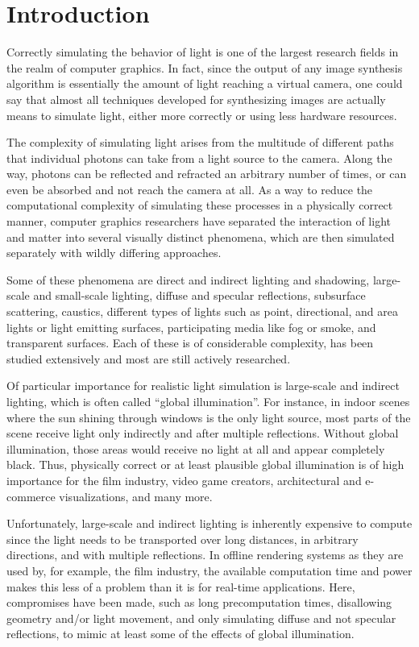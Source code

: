 
\chapter{Introduction}
\label{chap:introduction}

Correctly simulating the behavior of light is one of the largest research fields in the realm of computer graphics. In fact, since the output of any image synthesis algorithm is essentially the amount of light reaching a virtual camera, one could say that almost all techniques developed for synthesizing images are actually means to simulate light, either more correctly or using less hardware resources.

The complexity of simulating light arises from the multitude of different paths that individual photons can take from a light source to the camera. Along the way, photons can be reflected and refracted an arbitrary number of times, or can even be absorbed and not reach the camera at all. As a way to reduce the computational complexity of simulating these processes in a physically correct manner, computer graphics researchers have separated the interaction of light and matter into several visually distinct phenomena, which are then simulated separately with wildly differing approaches.

Some of these phenomena are direct and indirect lighting and shadowing, large-scale and small-scale lighting, diffuse and specular reflections, subsurface scattering, caustics, different types of lights such as point, directional, and area lights or light emitting surfaces, participating media like fog or smoke, and transparent surfaces. Each of these is of considerable complexity, has been studied extensively and most are still actively researched.

Of particular importance for realistic light simulation is large-scale and indirect lighting, which is often called ``global illumination''. For instance, in indoor scenes where the sun shining through windows is the only light source, most parts of the scene receive light only indirectly and after multiple reflections. Without global illumination, those areas would receive no light at all and appear completely black. Thus, physically correct or at least plausible global illumination is of high importance for the film industry, video game creators, architectural and e-commerce visualizations, and many more.

Unfortunately, large-scale and indirect lighting is inherently expensive to compute since the light needs to be transported over long distances, in arbitrary directions, and with multiple reflections. In offline rendering systems as they are used by, for example, the film industry, the available computation time and power makes this less of a problem than it is for real-time applications. Here, compromises have been made, such as long precomputation times, disallowing geometry and/or light movement, and only simulating diffuse and not specular reflections, to mimic at least some of the effects of global illumination.

